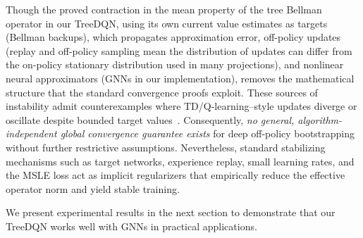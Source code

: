 \documentclass[preprint,12pt]{elsarticle} %
\theoremstyle{plain}
\theoremstyle{definition}
\theoremstyle{remark}
\begin{document}
Though the proved contraction in the mean property of the tree Bellman operator in our TreeDQN, %
using its own current value estimates as targets (Bellman backups), which propagates approximation error, off-policy updates (replay and off-policy sampling mean the distribution of updates can differ from the on-policy stationary distribution used in many projections), and nonlinear neural approximators (GNNs in our implementation), removes the mathematical structure that the standard convergence proofs exploit. These sources of instability admit counterexamples where TD/Q-learning–style updates diverge or oscillate despite bounded target values~\cite{sutton2018reinforcement}. Consequently, \emph{no general, algorithm-independent global convergence guarantee exists} for deep off-policy bootstrapping without further restrictive assumptions. Nevertheless, standard stabilizing mechanisms such as target networks, experience replay, small learning rates, and the MSLE loss act as implicit regularizers that empirically reduce the effective operator norm and yield stable training. 

We present experimental results in the next section to demonstrate that our TreeDQN works well with GNNs in practical applications.
\end{document}
